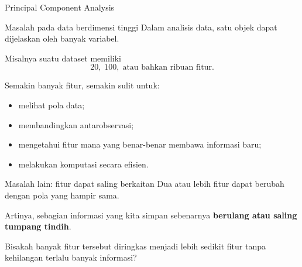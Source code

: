 \documentclass[aspectratio=169,11pt]{beamer}
\begin{document}
\begin{frame}{Principal Component Analysis}
\footnotesize
\begin{block}{Masalah pada data berdimensi tinggi}
Dalam analisis data, satu objek dapat dijelaskan oleh banyak variabel.

\medskip
Misalnya suatu dataset memiliki
\[
20,\;100,\;\text{atau bahkan ribuan fitur}.
\]

Semakin banyak fitur, semakin sulit untuk:
\begin{itemize}
    \item melihat pola data;
    \item membandingkan antarobservasi;
    \item mengetahui fitur mana yang benar-benar membawa informasi baru;
    \item melakukan komputasi secara efisien.
\end{itemize}
\end{block}

\pause

\begin{alertblock}{Masalah lain: fitur dapat saling berkaitan}
Dua atau lebih fitur dapat berubah dengan pola yang hampir sama.

Artinya, sebagian informasi yang kita simpan sebenarnya
\textbf{berulang atau saling tumpang tindih}.
\end{alertblock}

\pause

\begin{center}
\footnotesize
Bisakah banyak fitur tersebut diringkas menjadi lebih sedikit
fitur tanpa kehilangan terlalu banyak informasi?
\end{center}

\end{frame}
\end{document}
